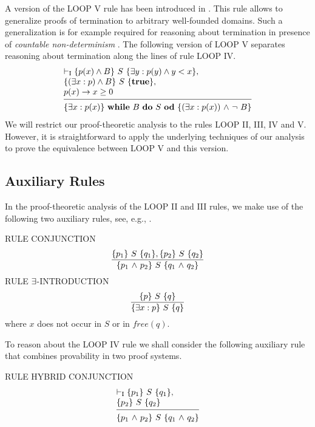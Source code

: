 \documentclass[runningheads]{llncs}       %
\begin{document}
A version of the LOOP V rule has been introduced in \cite{Harel79}.
This rule allows to generalize proofs of termination to arbitrary well-founded domains.
Such a generalization is for example required for
reasoning about termination in presence of \emph{countable non-determinism}
\cite{AptP86}.
The following version of LOOP V separates reasoning about
termination along the lines of rule LOOP IV.
\[
 \begin{array}{l}
 \vdash_{\rm{I}}\HT{p(x)\wedge B}{S}{\exists y: p(y)\wedge y< x},          \\
 \HT{(\exists x:p) \wedge B}{S}{\T},\\
  p(x)\rightarrow x\geq 0                          \\
  [-\medskipamount]
  \hrulefill                                \\
  \HT{\exists x:p(x)}{\WDD{B}{S}}{(\exists x:p(x)) \A \neg\ B}
 \end{array}
\]
We will restrict our proof-theoretic analysis to the rules
LOOP II, III, IV and V. However, it is straightforward to apply
the underlying techniques of our analysis to prove the equivalence between LOOP V and this version.

\subsection{Auxiliary Rules}
In the proof-theoretic analysis of the LOOP II and III rules, we make
use of the following two auxiliary rules, see, e.g., \cite{ABO09}.
\III

\NI
RULE \label{rul:conj} CONJUNCTION
\[ 
 \frac{ \mbox{$\{{p_1}\}\ {S}\ \{{q_1}\}$}, \mbox{$\{{p_2}\}\ {S}\ \{{q_2}\}$}     }
      { \mbox{$\{{p_1 \mbox{$\ \wedge\ $} p_2}\}\ {S}\ \{{q_1 \mbox{$\ \wedge\ $} q_2}\}$}         } 
\]
\NI
RULE \label{rul:intro} $\mbox{$\exists$}$-INTRODUCTION
\[ 
 \frac{ \mbox{$\{{p}\}\ {S}\ \{{q}\}$}          }
      { \mbox{$\{{\mbox{$\exists$} x:p}\}\ {S}\ \{{q}\}$}    }
\]
where $x$ does not occur in $S$ or in $\mathit{free}(q)$.

To reason about the LOOP IV rule
we shall consider the following auxiliary rule that combines provability
in two proof systems.

\III

\noindent
RULE HYBRID CONJUNCTION
\[
 \begin{array}{l}
  \vdash_{\rm{I}} \HT{p_1}{S}{q_1},   \\
  \HT{p_2}{S}{q_2}                    \\
  [-\medskipamount]
  \hrulefill                          \\
  \HT{p_1 \A p_2}{S}{q_1 \A q_2}
 \end{array}
\]
\end{document}
